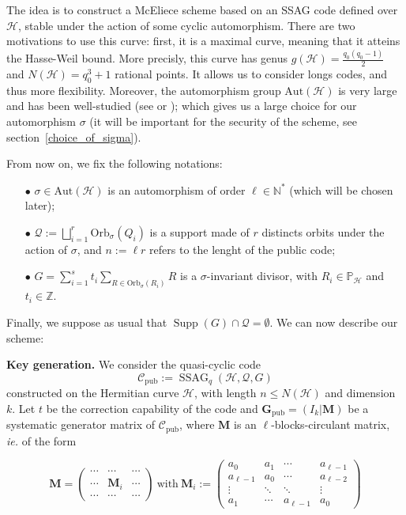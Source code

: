 \documentclass[10pt]{article}
\theoremstyle{definition}
\theoremstyle{definition}
\theoremstyle{definition}
\newcommand{\N}{\mathbb{N}}
\newcommand{\Z}{\mathbb{Z}}
\newcommand{\PP}{\mathbb{P}}
\newcommand{\calH}{\mathcal{H}}
\newcommand{\QR}{\mathcal{Q}}
\newcommand{\Supp}{\operatorname{Supp}}
\newcommand{\ssag}{\operatorname{SSAG}}
\begin{document}
The idea is to construct a McEliece scheme based on an SSAG code defined over $\calH$, stable under the action of some cyclic automorphism. There are two motivations to use this curve: first, it is a maximal curve,  meaning that it atteins the Hasse-Weil bound. More precisly, this curve has genus $g(\calH)= \frac{q_0(q_0-1)}{2}$ and $N(\calH)=q_0^3+1$ rational points. It allows us to consider longs codes, and thus more flexibility. Moreover, the automorphism group $\mathrm{Aut}(\mathcal{H})$ is very large and has been well-studied (see \cite{Sti} or \cite{Gar}); which gives us a large choice for our automorphism $\sigma$ (it will be important for the security of the scheme, see section~\ref{choice_of_sigma}). 

\vspace*{0.2cm}

\noindent From now on, we fix the following notations: 
\begin{enumerate}
\item[$\bullet$] $\sigma \in \mathrm{Aut}(\calH)$ is an automorphism of order $\ell \in \N^*$ (which will be chosen later);
\item[$\bullet$] $\QR := \bigsqcup\limits_{i=1}^{r} \mathrm{Orb}_{\sigma}(Q_i)$ is a support made of $r$ distincts orbits under the action of $\sigma$, and $n:=\ell r$ refers to the lenght of the public code;
\item[$\bullet$] $G = \sum\limits_{i=1}^s t_i \sum\limits_{R \in \mathrm{Orb}_{\sigma}(R_i)} R$ is a $\sigma$-invariant divisor, with $R_i \in \PP_{\mathcal{H}}$ and $t_i \in \Z$. 
\end{enumerate}

Finally, we suppose as usual that $\Supp(G)\cap \QR = \emptyset$. We can now describe our scheme: 

\vspace*{0.2cm}

\noindent \textbf{Key generation.} We consider the quasi-cyclic code 
\[\mathcal{C}_{\mathrm{pub}} := \ssag_q(\mathcal{H},\QR,G)\]
constructed on the Hermitian curve $\mathcal{H}$, with length $n \leq N(\mathcal{H})$ and dimension $k$. Let $t$ be the correction capability of the code and $\mathbf{G}_{\mathrm{pub}} = (I_k | \mathbf{M})$ be a systematic generator matrix of $\mathcal{C}_{\mathrm{pub}}$, where $\mathbf{M}$ is an $\ell$-blocks-circulant matrix, \textit{ie.} of the form 

\begin{equation*}
\mathbf{M}= \begin{pmatrix}
\cdots & \cdots & \cdots \\
\cdots & \mathbf{M}_i & \cdots \\
\cdots & \cdots & \cdots
\end{pmatrix}
\ \mathrm{with} \ \mathbf{M}_i := \begin{pmatrix}
a_0 & a_1 & \cdots & a_{\ell-1} \\
a_{\ell-1} & a_0 & \cdots & a_{\ell-2} \\
\vdots & \ddots & \ddots & \vdots \\
a_1 & \cdots & a_{\ell-1} & a_0 
\end{pmatrix}
\end{equation*}
\end{document}
